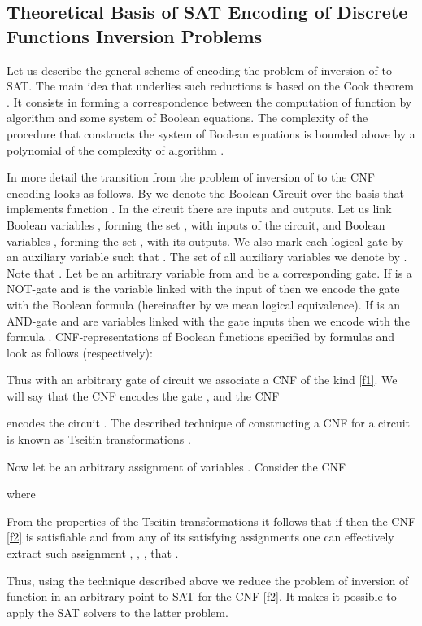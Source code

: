 \documentclass[runningheads,a4paper]{llncs}
\begin{document}
\subsection{Theoretical Basis of SAT Encoding of Discrete Functions Inversion Problems}

Let us describe the general scheme of encoding the problem of inversion of  to SAT. The main idea that underlies such reductions is based on the Cook theorem \cite{DBLP:conf/stoc/Cook71}. It consists in forming a correspondence between the computation of function  by algorithm  and some system of Boolean equations. The complexity of the procedure that constructs the system of Boolean equations is bounded above by a polynomial of the complexity of algorithm .

In more detail the transition from the problem of inversion of  to the CNF encoding looks as follows. By  we denote the Boolean Circuit over the basis  that implements function . In the circuit  there are  inputs and  outputs. Let us link Boolean variables , forming the set , with inputs of the circuit, and Boolean variables , forming the set , with its outputs. We also mark each logical gate  by an auxiliary variable  such that . The set of all auxiliary variables we denote by . Note that . Let  be an arbitrary variable from  and  be a corresponding gate. If  is a NOT-gate and  is the variable linked with the input of  then we encode the gate  with the Boolean formula  (hereinafter by  we mean logical equivalence). If  is an AND-gate and  are variables linked with the gate inputs then we encode  with the formula . CNF-representations of Boolean functions specified by formulas  and  look as follows (respectively):

Thus with an arbitrary gate  of circuit  we associate a CNF  of the kind \eqref{f1}. We will say that the CNF  encodes the gate , and the CNF 

encodes the circuit . The described technique of constructing a CNF for a circuit  is known as Tseitin transformations \cite{Tseitin83}. 

Now let  be an arbitrary assignment of variables . Consider the CNF

where 

From the properties of the Tseitin transformations it follows that if  then the CNF \eqref{f2} is satisfiable and from any of its satisfying assignments one can effectively extract such assignment , , , that .

Thus, using the technique described above we reduce the problem of inversion of function  in an arbitrary point  to SAT for the CNF \eqref{f2}. It makes it possible to apply the SAT solvers to the latter problem.
\end{document}

